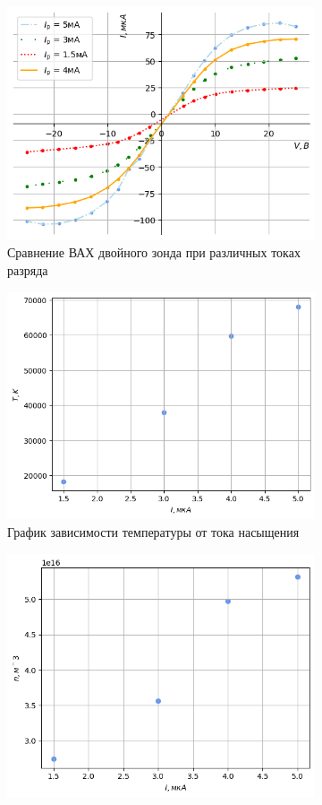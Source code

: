 \newpage
\begin{figure}[h!]
    \begin{subfigure}{0.95\linewidth}
        \centering
        \includegraphics[width=13cm]{images/plot2.png}
        \caption{Сравнение ВАХ двойного зонда при различных токах разряда}
    \end{subfigure}
    \vfill
    \begin{subfigure}{0.5\linewidth}
        \centering
        \includegraphics[width=10cm]{images/plot_TI.png}
        \caption{График зависимости температуры от тока насыщения}
    \end{subfigure}
    \hfill
    \begin{subfigure}{0.5\linewidth}
        \centering
        \includegraphics[width=10cm]{images/plot_TN.png}

\end{subfigure}
\end{figure}
